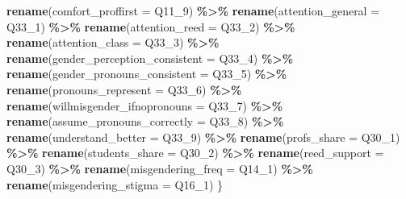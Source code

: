 \documentclass[12pt,twoside]{reedthesis}
\newenvironment{Shaded}{\begin{snugshade}}{\end{snugshade}}
\newcommand{\DataTypeTok}[1]{\textcolor[rgb]{0.13,0.29,0.53}{#1}}
\newcommand{\DecValTok}[1]{\textcolor[rgb]{0.00,0.00,0.81}{#1}}
\newcommand{\KeywordTok}[1]{\textcolor[rgb]{0.13,0.29,0.53}{\textbf{#1}}}
\newcommand{\NormalTok}[1]{#1}
\newcommand{\OperatorTok}[1]{\textcolor[rgb]{0.81,0.36,0.00}{\textbf{#1}}}
\newcommand{\StringTok}[1]{\textcolor[rgb]{0.31,0.60,0.02}{#1}}
\begin{document}
\begin{Shaded}
\begin{Highlighting}[]
\StringTok{    }\KeywordTok{rename}\NormalTok{(}\DataTypeTok{comfort\_proffirst =}\NormalTok{ Q11\_}\DecValTok{9}\NormalTok{) }\OperatorTok{\%\textgreater{}\%}
\StringTok{    }\KeywordTok{rename}\NormalTok{(}\DataTypeTok{attention\_general =}\NormalTok{ Q33\_}\DecValTok{1}\NormalTok{) }\OperatorTok{\%\textgreater{}\%}
\StringTok{    }\KeywordTok{rename}\NormalTok{(}\DataTypeTok{attention\_reed =}\NormalTok{ Q33\_}\DecValTok{2}\NormalTok{) }\OperatorTok{\%\textgreater{}\%}
\StringTok{    }\KeywordTok{rename}\NormalTok{(}\DataTypeTok{attention\_class =}\NormalTok{ Q33\_}\DecValTok{3}\NormalTok{) }\OperatorTok{\%\textgreater{}\%}
\StringTok{    }\KeywordTok{rename}\NormalTok{(}\DataTypeTok{gender\_perception\_consistent =}\NormalTok{ Q33\_}\DecValTok{4}\NormalTok{) }\OperatorTok{\%\textgreater{}\%}
\StringTok{    }\KeywordTok{rename}\NormalTok{(}\DataTypeTok{gender\_pronouns\_consistent =}\NormalTok{ Q33\_}\DecValTok{5}\NormalTok{) }\OperatorTok{\%\textgreater{}\%}
\StringTok{    }\KeywordTok{rename}\NormalTok{(}\DataTypeTok{pronouns\_represent =}\NormalTok{ Q33\_}\DecValTok{6}\NormalTok{) }\OperatorTok{\%\textgreater{}\%}
\StringTok{    }\KeywordTok{rename}\NormalTok{(}\DataTypeTok{willmisgender\_ifnopronouns =}\NormalTok{ Q33\_}\DecValTok{7}\NormalTok{) }\OperatorTok{\%\textgreater{}\%}
\StringTok{    }\KeywordTok{rename}\NormalTok{(}\DataTypeTok{assume\_pronouns\_correctly =}\NormalTok{ Q33\_}\DecValTok{8}\NormalTok{) }\OperatorTok{\%\textgreater{}\%}
\StringTok{    }\KeywordTok{rename}\NormalTok{(}\DataTypeTok{understand\_better =}\NormalTok{ Q33\_}\DecValTok{9}\NormalTok{) }\OperatorTok{\%\textgreater{}\%}
\StringTok{    }\KeywordTok{rename}\NormalTok{(}\DataTypeTok{profs\_share =}\NormalTok{ Q30\_}\DecValTok{1}\NormalTok{) }\OperatorTok{\%\textgreater{}\%}
\StringTok{    }\KeywordTok{rename}\NormalTok{(}\DataTypeTok{students\_share =}\NormalTok{ Q30\_}\DecValTok{2}\NormalTok{) }\OperatorTok{\%\textgreater{}\%}
\StringTok{    }\KeywordTok{rename}\NormalTok{(}\DataTypeTok{reed\_support =}\NormalTok{ Q30\_}\DecValTok{3}\NormalTok{) }\OperatorTok{\%\textgreater{}\%}
\StringTok{    }\KeywordTok{rename}\NormalTok{(}\DataTypeTok{misgendering\_freq =}\NormalTok{ Q14\_}\DecValTok{1}\NormalTok{) }\OperatorTok{\%\textgreater{}\%}
\StringTok{    }\KeywordTok{rename}\NormalTok{(}\DataTypeTok{misgendering\_stigma =}\NormalTok{ Q16\_}\DecValTok{1}\NormalTok{)}
\NormalTok{\}}


\end{Highlighting}
\end{Shaded}
\end{document}
